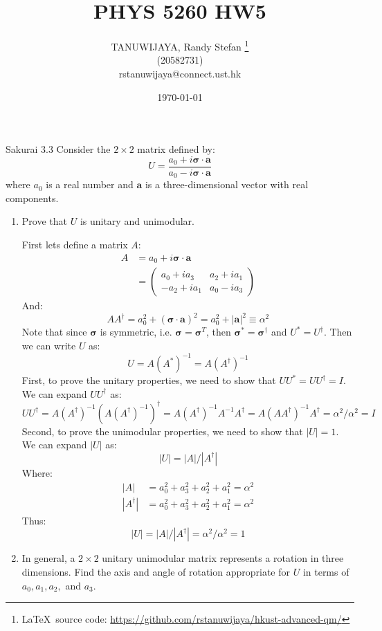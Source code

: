 \documentclass{article}
\title{PHYS 5260 HW5}
\author{TANUWIJAYA, Randy Stefan \footnote{\LaTeX\ source code: \url{https://github.com/rstanuwijaya/hkust-advanced-qm/}}
\\ (20582731) \\ rstanuwijaya@connect.ust.hk}
\affil{Department of Physics - HKUST}
\date{\today}
\newcommand{\bs}{\boldsymbol}
\begin{document}
\maketitle
\begin{section}{Sakurai 3.3}
Consider the $2\times 2$ matrix defined by:
$$
	U = \frac{a_0 + i \bs{\sigma} \cdot \bs{a}}{a_0 - i \bs{\sigma} \cdot \bs{a}}
$$
where $a_0$ is a real number and $\bs{a}$ is a three-dimensional vector with real components.
\begin{enumerate}
	\item Prove that $U$ is unitary and unimodular.

	\begin{tcolorbox}[breakable]
		First lets define a matrix $A$:
		\begin{align*}
			A & = a_0 + i \bs{\sigma} \cdot \bs{a} \\
			  & = \begin{pmatrix}
				      a_0 + i a_3  & a_2 + i a_1 \\
				      -a_2 + i a_1 & a_0 - i a_3
			      \end{pmatrix}
		\end{align*}
		And:
		$$
			A A^\dagger = a_0^2 + (\bs{\sigma} \cdot \bs{a})^2 = a_0^2 + |\bs{a}|^2 \equiv \alpha^2
		$$
		Note that since $\bs{\sigma}$ is symmetric, i.e. $\bs{\sigma} = \bs{\sigma}^T$, then $\bs{\sigma}^* = \bs{\sigma}^\dagger$ and $U^* = U^\dagger$. Then we can write $U$ as:
		$$
			U = A(A^*)^{-1} = A (A^\dagger)^{-1}
		$$
		First, to prove the unitary properties, we need to show that $UU^* = UU^\dagger = I$. We can expand $UU^\dagger$ as:
		$$
			UU^\dagger = A (A^\dagger)^{-1} (A (A^\dagger)^{-1})^\dagger = A (A^\dagger)^{-1} A^{-1} A^\dagger = A (A A^\dagger)^{-1} A^\dagger = \alpha^2/\alpha^2 = I
		$$
		Second, to prove the unimodular properties, we need to show that $|U| = 1$. We can expand $|U|$ as:
		$$
			|U| = |A|/|A^\dagger|
		$$
		Where:
		\begin{align*}
			|A|         & = a_0^2 + a_3^2 + a_2^2 + a_1^2 = \alpha^2 \\
			|A^\dagger| & = a_0^2 + a_3^2 + a_2^2 + a_1^2 = \alpha^2
		\end{align*}
		Thus:
		$$
			|U| = |A|/|A^\dagger| = \alpha^2/\alpha^2 = 1
		$$

	\end{tcolorbox}

	\item In general, a $2\times 2$ unitary unimodular matrix represents a rotation in three dimensions. Find the axis and angle of rotation appropriate for $U$ in terms of $a_0, a_1, a_2,$ and $a_3$.


\end{enumerate}
\end{section}
\end{document}
